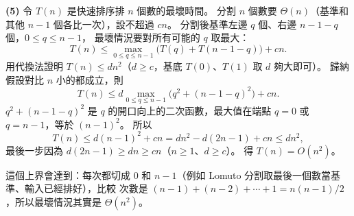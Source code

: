 \begin{pastsoln}
\textbf{(5)} 令 $T(n)$ 是快速排序排 $n$ 個數的最壞時間。 分割 $n$ 個數要 $\Theta(n)$（基準和其他
$n - 1$ 個各比一次），設不超過 $cn$。 分割後基準左邊 $q$ 個、右邊 $n - 1 - q$ 個，$0 \le q \le n - 1$，
最壞情況要對所有可能的 $q$ 取最大：
\[
T(n) \le \max_{0 \le q \le n-1} \bigl(T(q) + T(n - 1 - q)\bigr) + cn .
\]
用代換法證明 $T(n) \le dn^2$（$d \ge c$，基底 $T(0)$、$T(1)$ 取 $d$ 夠大即可）。 歸納假設對比
$n$ 小的都成立，則
\[
T(n) \le d \max_{0 \le q \le n-1} \bigl(q^2 + (n-1-q)^2\bigr) + cn .
\]
$q^2 + (n-1-q)^2$ 是 $q$ 的開口向上的二次函數，最大值在端點 $q = 0$ 或 $q = n - 1$，等於 $(n-1)^2$。
所以
\[
T(n) \le d(n-1)^2 + cn = dn^2 - d(2n - 1) + cn \le dn^2,
\]
最後一步因為 $d(2n - 1) \ge dn \ge cn$（$n \ge 1$、$d \ge c$）。 得 $T(n) = O(n^2)$。

這個上界會達到：每次都切成 $0$ 和 $n - 1$（例如 Lomuto 分割取最後一個數當基準、輸入已經排好），比較
次數是 $(n-1) + (n-2) + \cdots + 1 = n(n-1)/2$，所以最壞情況其實是 $\Theta(n^2)$。
\end{pastsoln}
